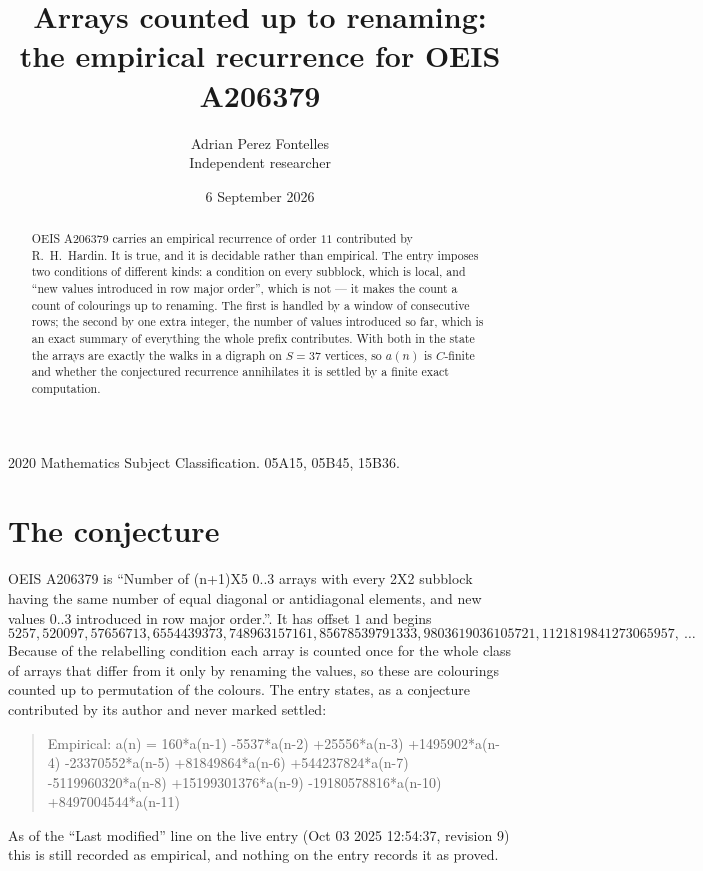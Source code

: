 \documentclass[11pt,a4paper]{article}
\title{Arrays counted up to renaming: the empirical recurrence for OEIS A206379}
\author{Adrian Perez Fontelles\\ \small Independent researcher}
\date{6 September 2026}
\theoremstyle{plain}
\theoremstyle{definition}
\begin{document}
\maketitle

\begin{abstract}
OEIS A206379 carries an empirical recurrence of order $11$ contributed by R.~H.~Hardin. It is
true, and it is decidable rather than empirical. The entry imposes two conditions of different
kinds: a condition on every subblock, which is local, and ``new values introduced in row major
order'', which is not --- it makes the count a count of colourings up to renaming. The first is
handled by a window of consecutive rows; the second by one extra integer, the number of values
introduced so far, which is an exact summary of everything the whole prefix contributes. With
both in the state the arrays are exactly the walks in a digraph on $S=37$ vertices, so $a(n)$
is $C$-finite and whether the conjectured recurrence annihilates it is settled by a finite
exact computation.
\end{abstract}

\noindent\small 2020 Mathematics Subject Classification. 05A15, 05B45, 15B36.\normalsize

\section{The conjecture}

OEIS A206379 is ``Number of (n+1)X5 0..3 arrays with every 2X2 subblock having the same number of equal diagonal or antidiagonal elements, and new values 0..3 introduced in row major order.''. It has offset $1$ and begins
\[
5257, 520097, 57656713, 6554439373, 748963157161, 85678539791333, 9803619036105721, 1121819841273065957,\ \dots
\]
Because of the relabelling condition each array is counted once for the whole class of arrays that differ from it only by renaming the values, so these are colourings counted up to permutation of the colours.
The entry states, as a conjecture contributed by its author and never marked settled:
\begin{quote}
Empirical: a(n) = 160*a(n-1) -5537*a(n-2) +25556*a(n-3) +1495902*a(n-4) -23370552*a(n-5) +81849864*a(n-6) +544237824*a(n-7) -5119960320*a(n-8) +15199301376*a(n-9) -19180578816*a(n-10) +8497004544*a(n-11)
\end{quote}
As of the ``Last modified'' line on the live entry (Oct 03 2025 12:54:37, revision 9) this is still
recorded as empirical, and nothing on the entry records it as proved.
\end{document}
